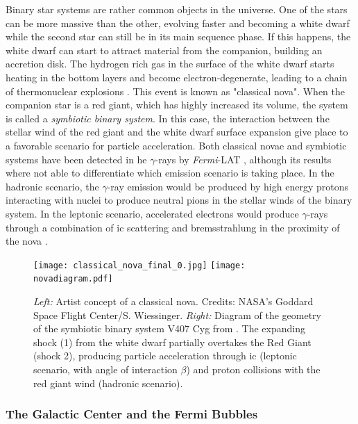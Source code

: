 \documentclass[main.tex]{subfiles}
\begin{document}
Binary star systems are rather common objects in the universe. One of the stars can be more massive than the other, evolving faster and becoming a white dwarf while the second star can still be in its main sequence phase. If this happens, the white dwarf can start to attract material from the companion, building an accretion disk. The hydrogen rich gas in the surface of the white dwarf starts heating in the bottom layers and become electron-degenerate, leading to a chain of thermonuclear explosions \cite{bode_evans_2008}. This event is known as "classical nova".
When the companion star is a red giant, which has highly increased its volume, the system is called a \textit{symbiotic binary system}. In this case, the interaction between the stellar wind of the red giant and the white dwarf surface expansion give place to a favorable scenario for particle acceleration.
 Both classical novae and symbiotic systems have been detected in \gls{he} $\gamma$-rays by \textit{Fermi}-LAT \cite{2010symbioticfermi}, \cite{2014fermiclassicNovae} although its results where not able to differentiate which emission scenario is taking place. In the hadronic scenario, the $\gamma$-ray emission would be produced by high energy protons interacting with nuclei to produce neutral pions in the stellar winds of the binary system. In the leptonic scenario, accelerated electrons would produce $\gamma$-rays through a combination of \gls{ic} scattering and bremsstrahlung in the proximity of the nova \cite{2012novagammaneutrinos}.\\
 
 \begin{figure}[!htb]
\texttt{[image: classical\_nova\_final\_0.jpg]}
\endminipage\hfill
{}
\texttt{[image: novadiagram.pdf]}
\endminipage\hfill
\caption{\label{fig:novae} \textit{Left:} Artist concept of a classical nova. Credits: NASA's Goddard Space Flight Center/S. Wiessinger. \textit{Right:} Diagram of the geometry of the symbiotic binary system V407 Cyg from \cite{2012novagammaneutrinos}. The expanding shock (1) from the white dwarf partially overtakes the Red Giant (shock 2), producing particle acceleration through \gls{ic} (leptonic scenario, with angle of interaction $\beta$) and proton collisions with the red giant wind (hadronic scenario).}
\end{figure}

\subsubsection{The Galactic Center and the Fermi Bubbles} \label{sec:GCFermiBubbles}
\end{document}
